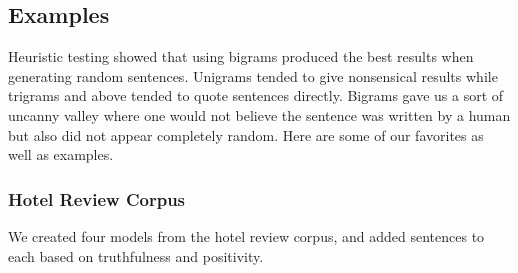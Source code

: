 \documentclass[12pt]{article}
\begin{document}
\subsection{Examples}
Heuristic testing showed that using bigrams produced the best results when generating random sentences. Unigrams tended to give nonsensical results while trigrams and above tended to quote sentences directly. Bigrams gave us a sort of uncanny valley where one would not believe the sentence was written by a human but also did not appear completely random. Here are some of our favorites as well as examples.
\subsubsection{Hotel Review Corpus}
We created four models from the hotel review corpus, and added sentences to each based on truthfulness and positivity.
\end{document}
